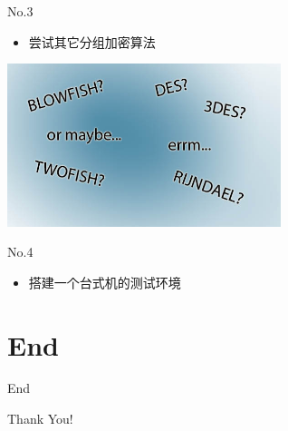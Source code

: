 \documentclass{beamer}
\begin{document}
\begin{frame}{No.3}
  \begin{itemize}
  \item  尝试其它分组加密算法
  \end{itemize}
  \begin{center}
    \includegraphics[width=8cm]{blockcipher.jpg}
    \end{center}
\end{frame}

\begin{frame}{No.4}
  \begin{itemize}
  \item  搭建一个台式机的测试环境
  \end{itemize}
\end{frame}

\section{End}

\begin{frame}{End}
  \begin{center}
    \alert{\Huge Thank You!}
  \end{center}
  
\end{frame}
\end{document}
